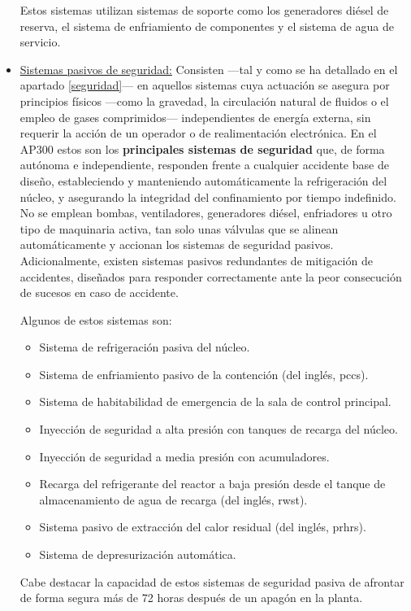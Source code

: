 \begin{itemize}
Estos sistemas utilizan sistemas de soporte como los generadores diésel de reserva, el sistema de enfriamiento de componentes y el sistema de agua de servicio. 
  
  \item \underline{Sistemas pasivos de seguridad:} Consisten ---tal y como se ha detallado en el apartado \ref{seguridad}--- en aquellos sistemas cuya actuación se asegura por principios físicos ---como la gravedad, la circulación natural de fluidos o el empleo de gases comprimidos--- independientes de energía externa, sin requerir la acción de un operador o de realimentación electrónica.
  En el AP300 estos son los \textbf{principales sistemas de seguridad} que, de forma autónoma e independiente, responden frente a cualquier accidente base de diseño, estableciendo y manteniendo automáticamente la refrigeración del núcleo, y asegurando la integridad del confinamiento por tiempo indefinido. No se emplean bombas, ventiladores, generadores diésel, enfriadores u otro tipo de maquinaria activa, tan solo unas válvulas que se alinean automáticamente y accionan los sistemas de seguridad pasivos.
  Adicionalmente, existen sistemas pasivos redundantes de mitigación de accidentes, diseñados para responder correctamente ante la peor consecución de sucesos en caso de accidente.
  
  Algunos de estos sistemas son:
  \begin{itemize}
    \item Sistema de refrigeración pasiva del núcleo.
    \item Sistema de enfriamiento pasivo de la contención (del inglés, \acrshort{pccs}).
    \item Sistema de habitabilidad de emergencia de la sala de control principal.
    \item Inyección de seguridad a alta presión con tanques de recarga del núcleo.
    \item Inyección de seguridad a media presión con acumuladores.
    \item Recarga del refrigerante del reactor a baja presión desde el tanque de almacenamiento de agua de recarga (del inglés, \acrshort{rwst}).
    \item Sistema pasivo de extracción del calor residual (del inglés, \acrshort{prhrs}).
    \item Sistema de depresurización automática.
  \end{itemize}
  
  Cabe destacar la capacidad de estos sistemas de seguridad pasiva de afrontar de forma segura más de 72 horas después de un apagón en la planta.


\end{itemize}
